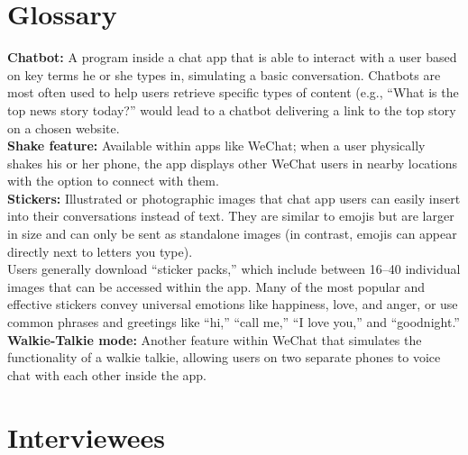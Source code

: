 \documentclass[notoc, symmetric, nobib, nols]{towcenter-guideto-book}
\newcommand{\blankpage}{\newpage\hbox{}\thispagestyle{empty}\newpage}
\begin{document}


\chapter{Glossary}
\blankpage

\noindent\textbf{Chatbot:} A program inside a chat app that is able to interact with a user based on key terms he or she types in, simulating a basic conversation. Chatbots are most often used to help users retrieve specific types of content (e.g., ``What is the top news story today?'' would lead to a chatbot delivering a link to the top story on a chosen website.\\
\vspace{\baselineskip}
\noindent\textbf{Shake feature:} Available within apps like WeChat; when a user physically shakes his or her phone, the app displays other WeChat users in nearby locations with the option to connect with them.\\
\vspace{\baselineskip}
\noindent\textbf{Stickers:} Illustrated or photographic images that chat app users can easily insert into their conversations instead of text. They are similar to emojis but are larger in size and can only be sent as standalone images (in contrast, emojis can appear directly next to letters you type). \\
\vspace{\baselineskip}
\noindent Users generally download ``sticker packs,'' which include between 16--40 individual images that can be accessed within the app. Many of the most popular and effective stickers convey universal emotions like happiness, love, and anger, or use common phrases and greetings like ``hi,'' ``call me,'' ``I love you,'' and ``goodnight.''\\
\vspace{\baselineskip}
\noindent\textbf{Walkie-Talkie mode:} Another feature within WeChat that simulates the functionality of a walkie talkie, allowing users on two separate phones to voice chat with each other inside the app.\\


\chapter{Interviewees}
\blankpage
\end{document}
